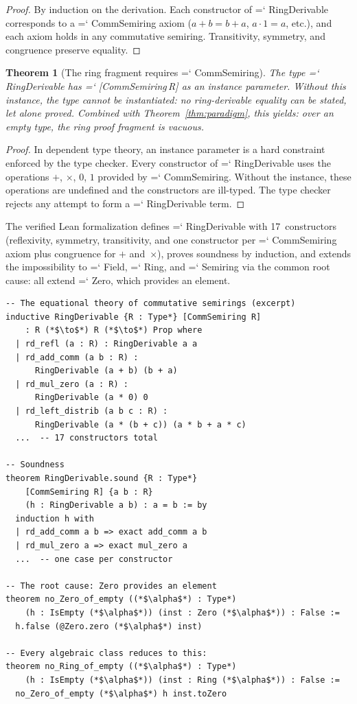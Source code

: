 \documentclass[11pt]{article}
\renewcommand{\texttt}[1]{%
  \begingroup\ttfamily\hyphenchar\font=`\-\relax
  \def\_{\textunderscore\discretionary{}{}{}}%
  #1\endgroup}
\newtheorem{theorem}{Theorem}
\theoremstyle{definition}
\theoremstyle{remark}
\begin{document}
\begin{proof}
By induction on the derivation.  Each constructor of
\texttt{RingDerivable} corresponds to a \texttt{CommSemiring} axiom
($a + b = b + a$, $a \cdot 1 = a$, etc.), and each axiom holds in
any commutative semiring.  Transitivity, symmetry, and congruence
preserve equality.
\end{proof}

\begin{theorem}[The ring fragment requires \texttt{CommSemiring}]%
\label{thm:ring_requires}
The type \texttt{RingDerivable} has \texttt{[CommSemiring\,R]} as an
instance parameter.  Without this instance, the type cannot be
instantiated: no ring-derivable equality can be \emph{stated}, let
alone proved.  Combined with Theorem~\ref{thm:paradigm}, this
yields: over an empty type, the ring proof fragment is vacuous.
\end{theorem}

\begin{proof}
In dependent type theory, an instance parameter is a hard
constraint enforced by the type checker.  Every constructor of
\texttt{RingDerivable} uses the operations $+$, $\times$, $0$, $1$
provided by \texttt{CommSemiring}.  Without the instance, these
operations are undefined and the constructors are ill-typed.
The type checker rejects any attempt to form a
\texttt{RingDerivable} term.
\end{proof}

\noindent The verified Lean formalization defines \texttt{RingDerivable}
with 17~constructors (reflexivity, symmetry, transitivity, and one
constructor per \texttt{CommSemiring} axiom plus congruence for $+$
and~$\times$), proves soundness by induction, and extends the
impossibility to \texttt{Field}, \texttt{Ring}, and \texttt{Semiring}
via the common root cause: all extend \texttt{Zero}, which provides
an element.

\begin{lstlisting}
-- The equational theory of commutative semirings (excerpt)
inductive RingDerivable {R : Type*} [CommSemiring R]
    : R (*$\to$*) R (*$\to$*) Prop where
  | rd_refl (a : R) : RingDerivable a a
  | rd_add_comm (a b : R) :
      RingDerivable (a + b) (b + a)
  | rd_mul_zero (a : R) :
      RingDerivable (a * 0) 0
  | rd_left_distrib (a b c : R) :
      RingDerivable (a * (b + c)) (a * b + a * c)
  ...  -- 17 constructors total

-- Soundness
theorem RingDerivable.sound {R : Type*}
    [CommSemiring R] {a b : R}
    (h : RingDerivable a b) : a = b := by
  induction h with
  | rd_add_comm a b => exact add_comm a b
  | rd_mul_zero a => exact mul_zero a
  ...  -- one case per constructor

-- The root cause: Zero provides an element
theorem no_Zero_of_empty ((*$\alpha$*) : Type*)
    (h : IsEmpty (*$\alpha$*)) (inst : Zero (*$\alpha$*)) : False :=
  h.false (@Zero.zero (*$\alpha$*) inst)

-- Every algebraic class reduces to this:
theorem no_Ring_of_empty ((*$\alpha$*) : Type*)
    (h : IsEmpty (*$\alpha$*)) (inst : Ring (*$\alpha$*)) : False :=
  no_Zero_of_empty (*$\alpha$*) h inst.toZero
\end{lstlisting}
\end{document}
